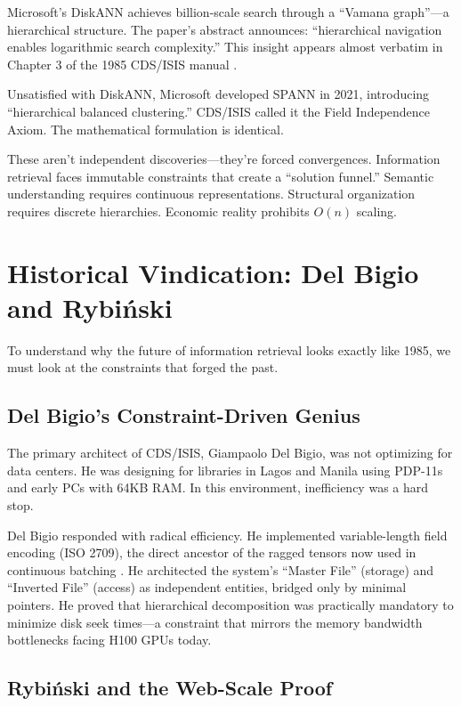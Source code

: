 \documentclass[manuscript,screen,nonacm]{acmart}
\begin{document}
Microsoft's DiskANN achieves billion-scale search through a ``Vamana graph''---a hierarchical structure. The paper's abstract announces: ``hierarchical navigation enables logarithmic search complexity.'' This insight appears almost verbatim in Chapter 3 of the 1985 CDS/ISIS manual \cite{unesco1989}.

Unsatisfied with DiskANN, Microsoft developed SPANN in 2021, introducing ``hierarchical balanced clustering.'' CDS/ISIS called it the Field Independence Axiom. The mathematical formulation is identical.

These aren't independent discoveries---they're forced convergences. Information retrieval faces immutable constraints that create a ``solution funnel.'' Semantic understanding requires continuous representations. Structural organization requires discrete hierarchies. Economic reality prohibits $O(n)$ scaling.

\section{Historical Vindication: Del Bigio and Rybiński}

To understand why the future of information retrieval looks exactly like 1985, we must look at the constraints that forged the past.

\subsection{Del Bigio's Constraint-Driven Genius}

The primary architect of CDS/ISIS, Giampaolo Del Bigio, was not optimizing for data centers. He was designing for libraries in Lagos and Manila using PDP-11s and early PCs with 64KB RAM. In this environment, inefficiency was a hard stop.

Del Bigio responded with radical efficiency. He implemented variable-length field encoding (ISO 2709), the direct ancestor of the ragged tensors now used in continuous batching \cite{iso2709}. He architected the system's ``Master File'' (storage) and ``Inverted File'' (access) as independent entities, bridged only by minimal pointers. He proved that hierarchical decomposition was practically mandatory to minimize disk seek times---a constraint that mirrors the memory bandwidth bottlenecks facing H100 GPUs today.

\subsection{Rybiński and the Web-Scale Proof}
\end{document}
